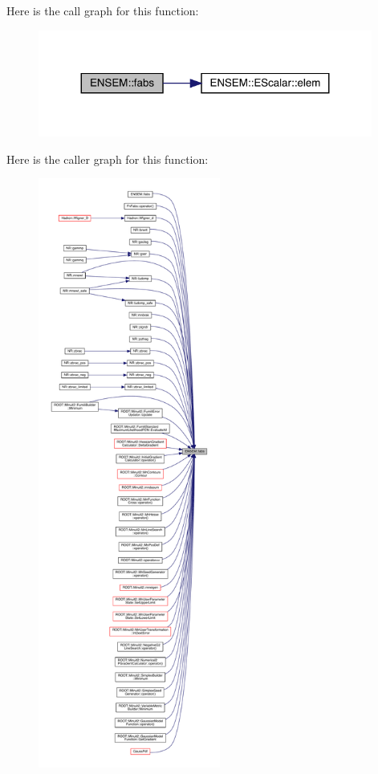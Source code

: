 Here is the call graph for this function\+:
\nopagebreak
\begin{figure}[H]
\begin{center}
\leavevmode
\includegraphics[width=311pt]{d4/dca/group__escalar_ga60eef052054b1a7da3e16a844de7d565_cgraph}
\end{center}
\end{figure}
Here is the caller graph for this function\+:
\nopagebreak
\begin{figure}[H]
\begin{center}
\leavevmode
\includegraphics[height=550pt]{d4/dca/group__escalar_ga60eef052054b1a7da3e16a844de7d565_icgraph}
\end{center}
\end{figure}
\mbox{\label{group__escalar_ga3598759ad3e33b4008dd80a044cc75a8}} 
